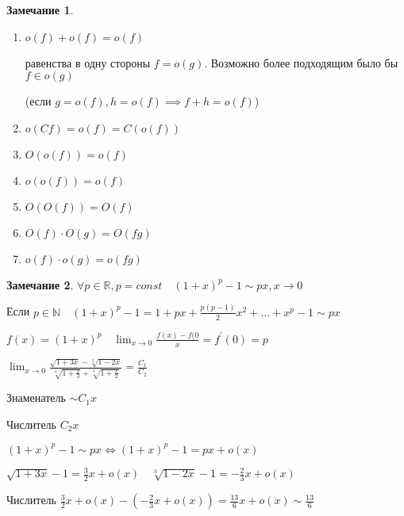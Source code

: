 \documentclass{book}
\newcommand\N{\ensuremath{\mathbb{N}}}
\newcommand\R{\ensuremath{\mathbb{R}}}
\newcommand{\p}[1]{#1^{\prime}}
\theoremstyle{definition}
\newtheorem*{note}{Замечание}
\begin{document}
\begin{note}
    \begin{enumerate}
        \item 
    $o(f) + o(f) = o(f)$

    равенства в одну стороны  $f = o(g)$. Возможно более подходящим было бы  $f \in o(g)$

    (если $g = o(f), h = o(f) \implies f + h = o(f)$) 
\item $o(Cf) = o(f) = C\left( o(f) \right) $
\item  $O(o(f)) = o(f)$ 

\item $o(o(f)) = o(f)$
\item $O(O(f)) = O(f)$
\item  $O(f)\cdot O(g) = O(fg)$
\item $o(f)\cdot o(g) = o(fg)$
    \end{enumerate}



\end{note}
\begin{note}
    $\forall p\in \R, p=const\quad (1+x)^p-1\sim px, x\to 0$

    Если $p\in \N \quad (1+x)^p-1 = 1+px + \frac{p(p-1)}{2}x^2 + \ldots + x^p-1 \sim px$ 

    $f(x) = (1+x)^p\quad \lim_{x \to 0} \frac{f(x)-f(0}{x} = \p f(0) = p$
\end{note}

$ \lim_{x \to 0} \frac{\sqrt{1+3x} - \sqrt[3]{1-2x}  }{\sqrt[4]{1+\frac{x}{3}} + \sqrt[5]{1+\frac{x}{2}}} = \frac{C_1}{C_2}$

Знаменатель $\sim C_1x$

Числитель $C_2x$

$(1+x)^p-1\sim px\iff (1+x)^p-1 = px + o(x)$

$\sqrt{1+3x}-1 = \frac{3}{2}x+o(x)\quad \sqrt[3]{1-2x}-1 = -\frac{2}{3}x+o(x)  $ 

Числитель $\frac{3}{2}x+o(x) -\left( -\frac{2}{3}x + o(x) \right)  = \frac{13}{6}x + o(x)\sim \frac{13}{6}$
\end{document}

